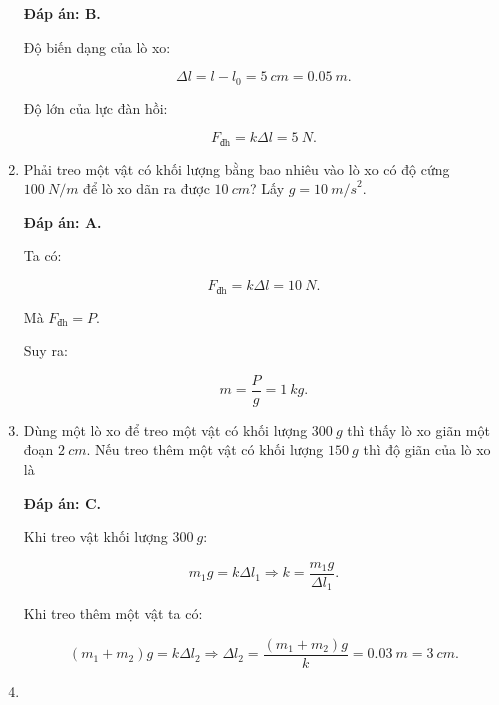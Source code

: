 \begin{enumerate}[label=\bfseries Câu \arabic*:, leftmargin=1.5cm]
	\hideall
	{	
		\textbf{Đáp án: B.}
		
		Độ biến dạng của lò xo:
		
		$$\Delta l = l-l_0 = \SI{5}{cm} = \SI{0,05}{m}.$$
		
		Độ lớn của lực đàn hồi:
		
		$$F_\text{đh} = k\Delta l = \SI{5}{N}.$$
		
	}
	\item {}
	
	
	{
		Phải treo một vật có khối lượng bằng bao nhiêu vào lò xo có độ cứng $\SI{100}{N/m}$ để lò xo dãn ra được $\SI{10}{cm}$? Lấy $g = \SI{10}{m/s}^2$. 
	}
	
	\hideall
	{	
		\textbf{Đáp án: A.}
		
		Ta có: 
		
		$$F_\text{đh} = k\Delta l = \SI{10}{N}.$$
		
		Mà $F_\text{đh} = P.$
		
		Suy ra:
		
		$$m = \dfrac{P}{g} = \SI{1}{kg}.$$
		
		
	}
	
	\item {}
	
	
	{
		Dùng một lò xo để treo một vật có khối lượng $\SI{300}{g}$ thì thấy lò xo giãn một đoạn $\SI{2}{cm}$. Nếu treo thêm một vật có khối lượng $\SI{150}{g}$ thì độ giãn của lò xo là
	}
	
	\hideall
	{	
		\textbf{Đáp án: C.}
		
		Khi treo vật khối lượng $\SI{300}{g}$:
		
		$$m_1g = k\Delta l_1 \Rightarrow k = \dfrac{m_1 g}{\Delta l_1}.$$
		
		Khi treo thêm một vật ta có:
		
		$$(m_1+m_2)g = k\Delta l_2 \Rightarrow \Delta l_2 = \dfrac{(m_1+m_2)g}{k} = \SI{0,03}{m} = \SI{3}{cm}.$$
	}
	\item {}
	

\end{enumerate}
